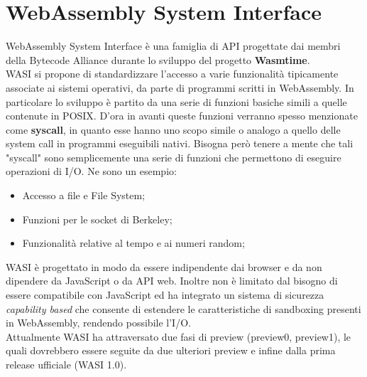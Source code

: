 \section{WebAssembly System Interface}
\label{sec:WASI}
WebAssembly System Interface è una famiglia di API progettate dai membri della Bytecode Alliance durante lo sviluppo del progetto \textbf{Wasmtime}.\cite*{wasiHome}
\\WASI si propone di standardizzare l'accesso a varie funzionalità tipicamente associate ai sistemi operativi, da parte di programmi scritti in WebAssembly. In particolare lo sviluppo è partito da una serie di funzioni basiche simili a quelle contenute in POSIX.
D'ora in avanti queste funzioni verranno spesso menzionate come \textbf{syscall}, in quanto esse hanno uno scopo simile o analogo a quello delle system call in programmi eseguibili nativi.
Bisogna però tenere a mente che tali "syscall" sono semplicemente una serie di funzioni che permettono di eseguire operazioni di I/O. Ne sono un esempio:
\begin{itemize}
        \item Accesso a file e File System;
        \item Funzioni per le socket di Berkeley;
        \item Funzionalità relative al tempo e ai numeri random;
\end{itemize}
WASI è progettato in modo da essere indipendente dai browser e da non dipendere da JavaScript o da API web. Inoltre non è limitato dal bisogno di essere compatibile con JavaScript ed ha integrato un sistema di sicurezza \emph{capability based} che consente di estendere le caratteristiche di sandboxing presenti in WebAssembly, rendendo possibile l'I/O.
\\Attualmente WASI ha attraversato due fasi di preview (preview0, preview1), le quali dovrebbero essere seguite da due ulteriori preview e infine dalla prima release ufficiale (WASI 1.0).
